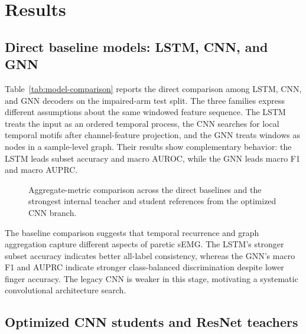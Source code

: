 \section{Results}

\subsection{Direct baseline models: LSTM, CNN, and GNN}

Table~\ref{tab:model-comparison} reports the direct comparison among LSTM, CNN, and GNN decoders on the impaired-arm test split. The three families express different assumptions about the same windowed feature sequence. The LSTM treats the input as an ordered temporal process, the CNN searches for local temporal motifs after channel-feature projection, and the GNN treats windows as nodes in a sample-level graph. Their results show complementary behavior: the LSTM leads subset accuracy and macro AUROC, while the GNN leads macro F1 and macro AUPRC.

\begin{table}[!htbp]
  \centering
  \small
  \caption{Held-out test performance for the three direct model families. Subset accuracy is the multilabel exact match ratio. Bold numbers mark the best score in each column within this baseline comparison.}
  \label{tab:model-comparison}
  
\end{table}

\begin{figure}[!htbp]
  \centering
  
  \caption{Aggregate-metric comparison across the direct baselines and the strongest internal teacher and student references from the optimized CNN branch.}
  \label{fig:model-comparison}
\end{figure}

The baseline comparison suggests that temporal recurrence and graph aggregation capture different aspects of paretic sEMG. The LSTM's stronger subset accuracy indicates better all-label consistency, whereas the GNN's macro F1 and AUPRC indicate stronger class-balanced discrimination despite lower finger accuracy. The legacy CNN is weaker in this stage, motivating a systematic convolutional architecture search.
\FloatBarrier

\subsection{Optimized CNN students and ResNet teachers}

